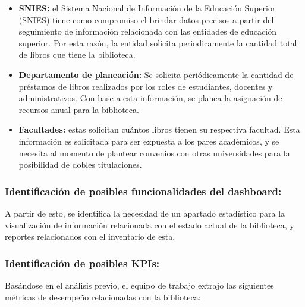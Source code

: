 \documentclass[spanish]{ieee_upb}
\begin{document}
\begin{itemize}
    \item \textbf{SNIES: }el Sistema Nacional de Información de la Educación Superior (SNIES) tiene como compromiso el brindar datos precisos a partir del seguimiento de información relacionada con las entidades de educación superior\cite{MEN2024_SIES_EEES2023}. Por esta razón, la entidad solicita periodicamente la cantidad total de libros que tiene la biblioteca. 

    \item \textbf{Departamento de planeación: } 
    Se solicita periódicamente la cantidad de préstamos de libros realizados por los roles de estudiantes, docentes y administrativos. Con base a esta información, se planea la asignación de recursos anual para la biblioteca. 

    \item \textbf{Facultades: }estas solicitan cuántos libros tienen su respectiva facultad. Esta información es solicitada para ser expuesta a los pares académicos, y se necesita al momento de plantear convenios con otras universidades para la posibilidad de dobles titulaciones.
    
\end{itemize}

\subsubsection{Identificación de posibles funcionalidades del dashboard: } A partir de esto,  se identifica la necesidad de un apartado estadístico para la visualización de información relacionada con el estado actual de la biblioteca, y reportes relacionados con el inventario de esta.

\vspace{0.3cm}
\subsubsection{Identificación de posibles KPIs: } 
Basándose en el análisis previo, el equipo de trabajo extrajo las siguientes métricas de desempeño relacionadas con la biblioteca:
\end{document}
